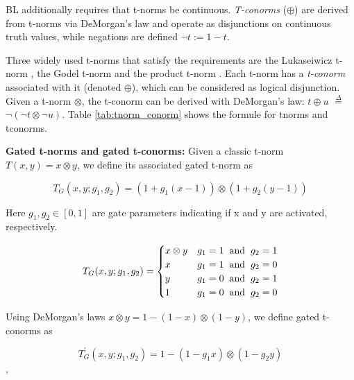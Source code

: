 \noindent BL additionally requires that t-norms be continuous. \textit{T-conorms} ($\oplus$) are derived from t-norms via DeMorgan’s law and operate as disjunctions on continuous truth values, while negations are defined $\neg{t} := 1 - t$.

\noindent Three widely used t-norms that satisfy the requirements are the
Lukaseiwicz t-norm \cite{luka}, the Godel t-norm \cite{baaz1996} and the product t-norm \cite{hajek1996}. Each t-norm has a \textit{t-conorm} associated with it (denoted $\oplus$), which can be
considered as logical disjunction. Given a t-norm $\otimes$, the t-conorm can be derived with DeMorgan’s
law: $t \oplus u$ $\overset{\Delta}{=}$ $\neg{(\neg{t} \otimes \neg{u})}$. Table \ref{tab:tnorm_conorm} shows the formule for tnorms and tconorms.



\noindent\textbf{Gated t-norms and gated t-conorms:} Given a classic t-norm $T(x, y) = x \otimes y$, we define its associated gated t-norm as 

$$T_{G}(x,y;g_{1},g_{2}) = (1 + g_{1}(x - 1)) \otimes (1 + g_{2}(y - 1))$$

Here $g_{1}, g_{2} \in [0, 1]$ are gate parameters indicating if x and y are activated, respectively.

\[
    T_{G}(x,y;g_{1},g_{2})= 
\begin{cases}
    x \otimes y & g_{1} = 1 \hspace{2mm} \text{and} \hspace{2mm} g_{2} = 1\\
    x & g_{1} = 1 \hspace{2mm} \text{and} \hspace{2mm} g_{2} = 0\\
    y & g_{1} = 0 \hspace{2mm} \text{and} \hspace{2mm} g_{2} = 1\\
    1 & g_{1} = 0 \hspace{2mm} \text{and} \hspace{2mm} g_{2} = 0
\end{cases}
\]

Using DeMorgan’s laws $x \otimes y = 1 - (1 - x) \otimes (1 - y)$, we define gated t-conorms as

$$T_{G}^{'}(x,y;g_{1},g_{2}) = 1 - (1 - g_{1}x) \otimes (1 - g_{2}y)$$,

